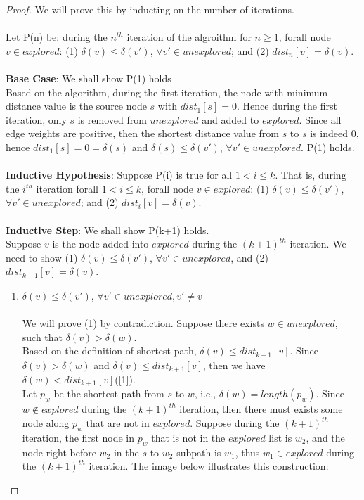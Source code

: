 \documentclass[11pt, a4paper]{article} %
\theoremstyle{definition}
\newcommand\tab[1][1cm]{\hspace*{#1}}
\begin{document}
\begin{proof}
We will prove this by inducting on the number of iterations. 
\\\\
Let P(n) be: during the $n^{th}$ iteration of the algroithm for $n \geq 1$, forall node $v \in explored$: (1) $\delta(v) \leq \delta(v')$, $\forall v' \in unexplored$; and (2) $dist_n[v] = \delta(v)$. 
\tab\\\\
\textbf{Base Case}: We shall show P(1) holds \\
Based on the algorithm, during the first iteration, the node with minimum distance value is the source node $s$ with $dist_1[s] = 0$. Hence during the first iteration, only $s$ is removed from $unexplored$ and added to $explored$. Since all edge weights are positive, then the shortest distance value from $s$ to $s$ is indeed $0$, hence $dist_1[s] = 0 = \delta(s)$ and $\delta(s) \leq \delta(v')$, $\forall v' \in unexplored$. P(1) holds.
\\\\
\textbf{Inductive Hypothesis}: Suppose P(i) is true for all $1 < i \leq k$. That is, during the $i^{th}$ iteration forall $1 < i \leq k$, forall node $v \in explored$: (1) $\delta(v) \leq \delta(v')$, $\forall v' \in unexplored$; and (2) $dist_i[v] = \delta(v)$. 
\\\\
\textbf{Inductive Step}: We shall show P(k+1) holds.
\\
Suppose $v$ is the node added into $explored$ during the $(k+1)^{th}$ iteration. We need to show (1) $\delta(v) \leq \delta(v')$, $\forall v' \in unexplored$, and (2) $dist_{k+1}[v] = \delta(v)$. 
\begin{enumerate}
\item $\delta(v) \leq \delta(v')$, $\forall v' \in unexplored, v' \neq v$
\\\\
We will prove (1) by contradiction. Suppose there exists $w \in unexplored$, such that $\delta(v) > \delta(w)$. 
\\
Based on the definition of shortest path, $\delta(v) \leq dist_{k+1}[v]$. Since $\delta(v) > \delta(w)$ and $\delta(v) \leq dist_{k+1}[v]$, then we have $\delta(w) < dist_{k+1}[v]$([1]). 
\\
Let $p_w$ be the shortest path from $s$ to $w$, i.e., $\delta(w) = length(p_w)$. Since $w \notin explored$ during the $(k+1)^{th}$ iteration, then there must exists some node along $p_w$ that are not in $explored$. Suppose during the $(k+1)^{th}$ iteration, the first node in $p_w$ that is not in the $explored$ list is $w_2$, and the node right before $w_2$ in the $s$ to $w_2$ subpath is $w_1$, thus $w_1 \in explored$ during the $(k+1)^{th}$ iteration. The image below illustrates this construction: 

\end{enumerate}
\end{proof}
\end{document}
